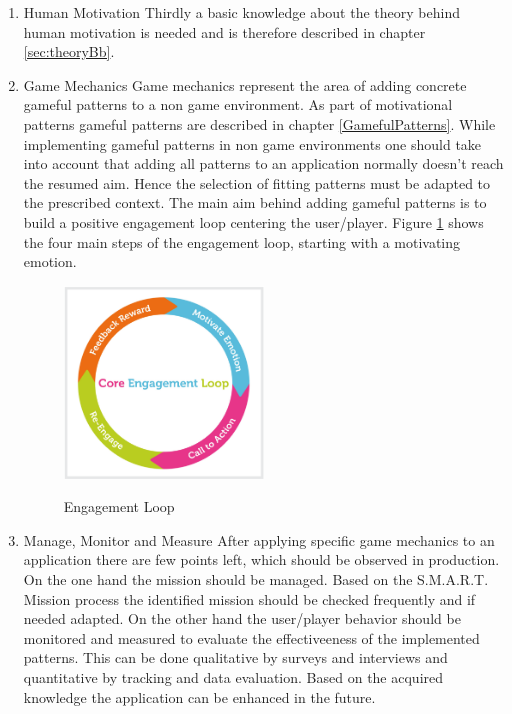 \begin{enumerate}
	\item Human Motivation \newline
	Thirdly a basic knowledge about the theory behind human motivation is needed and is therefore described in chapter \ref{sec:theoryBb}.
	
	\item Game Mechanics \newline
	Game mechanics represent the area of adding concrete gameful patterns to a non game environment. As part of motivational patterns gameful patterns are described in chapter \ref{GamefulPatterns}. While implementing gameful patterns in non game environments one should take into account that adding all patterns to an application normally doesn't reach the resumed aim. Hence the selection of fitting patterns must be adapted to the prescribed context. The main aim behind adding gameful patterns is to build a positive engagement loop centering the user/player. Figure \ref{fig:engagementLoop} shows the four main steps of the engagement loop, starting with a motivating emotion.  \cite[p. 69-71]{inproceedings}
	
	\begin{figure}[htbp] 
		\centering
		\includegraphics[width=0.5\textwidth]{Content/Theory/EngagementLoop.png}
		\caption{Engagement Loop}
		\cite[p. 88]{inproceedings}
		\label{fig:engagementLoop}
	\end{figure}
	
	\item Manage, Monitor and Measure \newline
	After applying specific game mechanics to an application there are few points left, which should be observed in production. On the one hand the mission should be managed. Based on the S.M.A.R.T. Mission process the identified mission should be checked frequently and if needed adapted. On the other hand the user/player behavior should be monitored and measured to evaluate the effectiveeness of the implemented patterns. This can be done qualitative by surveys and interviews and quantitative by tracking and data evaluation. Based on the acquired knowledge the application can be enhanced in the future.	\cite[p. 92-96]{inproceedings}
\end{enumerate}

